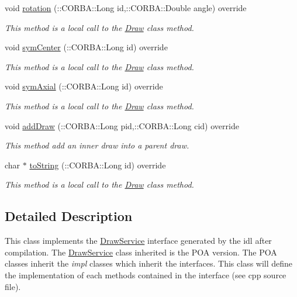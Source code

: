 \begin{DoxyCompactItemize}
void \hyperlink{class_draw_service_impl_a01fab41862413e70cd171883c36056a7}{rotation} (\+::C\+O\+R\+B\+A\+::\+Long id,\+::C\+O\+R\+B\+A\+::\+Double angle) override
\begin{DoxyCompactList}\small\item\em This method is a local call to the \hyperlink{class_draw}{Draw} class method. \end{DoxyCompactList}\item 
void \hyperlink{class_draw_service_impl_a6d464f4798e45309ce29c69a60a04d2d}{sym\+Center} (\+::C\+O\+R\+B\+A\+::\+Long id) override
\begin{DoxyCompactList}\small\item\em This method is a local call to the \hyperlink{class_draw}{Draw} class method. \end{DoxyCompactList}\item 
void \hyperlink{class_draw_service_impl_aa2aa750626c52f3e00056216e854e09e}{sym\+Axial} (\+::C\+O\+R\+B\+A\+::\+Long id) override
\begin{DoxyCompactList}\small\item\em This method is a local call to the \hyperlink{class_draw}{Draw} class method. \end{DoxyCompactList}\item 
void \hyperlink{class_draw_service_impl_a9e4fe6a245439b112c5985682d759fb2}{add\+Draw} (\+::C\+O\+R\+B\+A\+::\+Long pid,\+::C\+O\+R\+B\+A\+::\+Long cid) override
\begin{DoxyCompactList}\small\item\em This method add an inner draw into a parent draw. \end{DoxyCompactList}\item 
char $\ast$ \hyperlink{class_draw_service_impl_a5cc444981cf134ad07a4c0e468883676}{to\+String} (\+::C\+O\+R\+B\+A\+::\+Long id) override
\begin{DoxyCompactList}\small\item\em This method is a local call to the \hyperlink{class_draw}{Draw} class method. \end{DoxyCompactList}\end{DoxyCompactItemize}


\subsection{Detailed Description}
This class implements the \hyperlink{class_draw_service}{Draw\+Service} interface generated by the idl after compilation. The \hyperlink{class_draw_service}{Draw\+Service} class inherited is the P\+OA version. The P\+OA classes inherit the {\itshape impl} classes which inherit the interfaces. This class will define the implementation of each methods contained in the interface (see cpp source file). 

